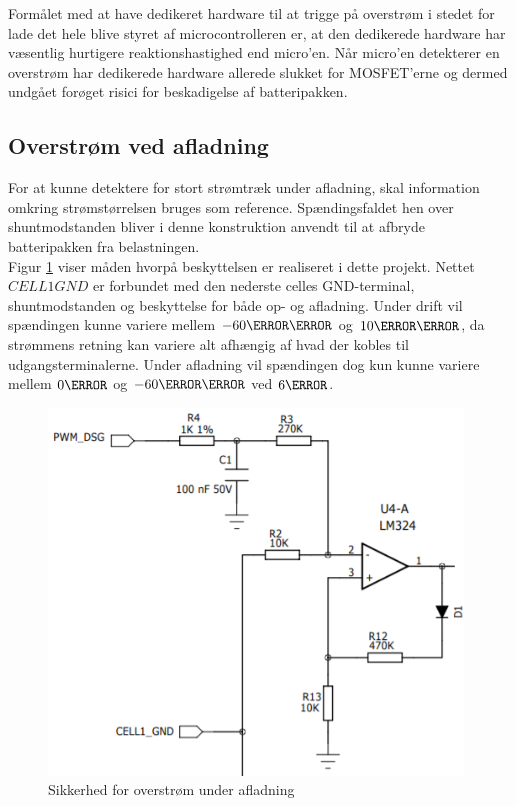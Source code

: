 Formålet med at have dedikeret hardware til at trigge på overstrøm i stedet for lade det hele blive styret af microcontrolleren er, at den dedikerede hardware har væsentlig hurtigere reaktionshastighed end micro'en. Når micro'en detekterer en overstrøm har dedikerede hardware allerede slukket for MOSFET'erne og dermed undgået forøget risici for beskadigelse af batteripakken.
\\

\subsection{Overstrøm ved afladning}\label{sec:overcurrent_dsg}
For at kunne detektere for stort strømtræk under afladning, skal information omkring strømstørrelsen bruges som reference. Spændingsfaldet hen over shuntmodstanden bliver i denne konstruktion anvendt til at afbryde batteripakken fra belastningen.
\\

Figur \ref{fig:overcurrent_discharge} viser måden hvorpå beskyttelsen er realiseret i dette projekt. Nettet $CELL1GND$ er forbundet med den nederste celles GND-terminal, shuntmodstanden og beskyttelse for både op- og afladning. Under drift vil spændingen kunne variere mellem $-60\milli\volt$ og $10\milli\volt$, da strømmens retning kan variere alt afhængig af hvad der kobles til udgangsterminalerne. Under afladning vil spændingen dog kun kunne variere mellem $0\volt$ og $-60\milli\volt$ ved $6\ampere$.
\\

\begin{figure}[h]
	\centering
	\includegraphics[width=11cm]{billeder/overcurrent_discharge.png}
	\caption{Sikkerhed for overstrøm under afladning}
	\label{fig:overcurrent_discharge}
\end{figure}

